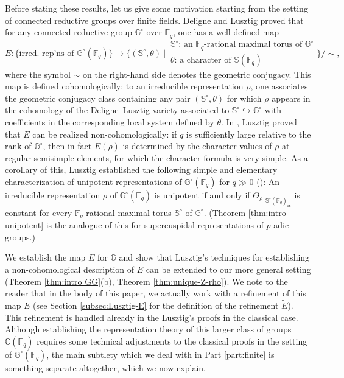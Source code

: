 \documentclass{amsart}
\newcommand{\rs}{\mathrm{rs}}
\newcommand{\F}{\mathbb{F}}
\newcommand{\FF}{\mathbb{F}}
\newcommand{\bbS}{\mathbb{S}}
\newcommand{\bbG}{\mathbb{G}}
\newcommand{\from}{\colon}
\theoremstyle{plain}
\theoremstyle{definition}
\theoremstyle{remark}
\theoremstyle{theorem}
\begin{document}
Before stating these results, let us give some motivation starting from the setting of connected reductive groups over finite fields. Deligne and Lusztig \cite{DL76} proved that for any connected reductive group $\bbG^\circ$ over $\FF_q$, one has a well-defined map
\[
E \from \{\text{irred.\ rep'ns of $\bbG^\circ(\FF_q)$}\}
\to
\biggl\{
(\bbS^{\circ},\theta)
\ \bigg\vert\,
\begin{array}{l}
\text{$\bbS^\circ$: an $\F_{q}$-rational maximal torus of $\bbG^{\circ}$} \\
\text{$\theta$: a character of $\bbS(\F_{q})$}
\end{array}
\biggl\}\big/{\sim},
\]
where the symbol $\sim$ on the right-hand side denotes the geometric conjugacy.
This map is defined cohomologically: to an irreducible representation $\rho$, one associates the geometric conjugacy class containing any pair $(\bbS^\circ,\theta)$ for which $\rho$ appears in the cohomology of the Deligne--Lusztig variety associated to $\bbS^\circ \hookrightarrow \bbG^\circ$ with coefficients in the corresponding local system defined by $\theta$. In \cite{Lus20}, Lusztig proved that $E$ can be realized non-cohomologically: if $q$ is sufficiently large relative to the rank of $\bbG^{\circ}$, then in fact $E(\rho)$ is determined by the character values of $\rho$ at regular semisimple elements, for which the character formula is very simple. 
As a corollary of this, Lusztig established the following simple and elementary characterization of unipotent representations of $\bbG^\circ(\FF_q)$ for $q \gg 0$ (\cite[6]{Lus20}):
An irreducible representation $\rho$ of $\bbG^\circ(\FF_q)$ is unipotent if and only if $\Theta_\rho|_{\bbS^\circ(\FF_q)_{\rs}}$ is constant for every $\F_{q}$-rational maximal torus $\bbS^\circ$ of $\bbG^\circ$.
(Theorem \ref{thm:intro unipotent} is the analogue of this for supercuspidal representations of $p$-adic groups.)

We establish the map $E$ for $\bbG$ and show that Lusztig's techniques for establishing a non-cohomological description of $E$ can be extended to our more general setting (Theorem \ref{thm:intro GG}(b), Theorem \ref{thm:unique-Z-rho}). 
We note to the reader that in the body of this paper, we actually work with a refinement of this map $E$ (see Section \ref{subsec:Lusztig-E} for the definition of the refinement $\tilde E$). This refinement is handled already in the Lusztig's proofs in the classical case. Although establishing the representation theory of this larger class of groups $\bbG(\FF_q)$ requires some technical adjustments to the classical proofs in the setting of $\bbG^\circ(\FF_q)$, the main subtlety which we deal with in Part \ref{part:finite} is something separate altogether, which we now explain.
\end{document}
